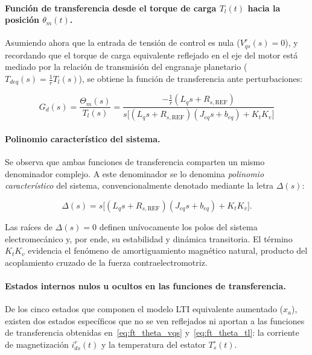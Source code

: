 \documentclass[10pt,a4paper]{article}
\begin{document}
\paragraph{Función de transferencia desde el torque de carga $T_l(t)$ hacia la posición $\theta_m(t)$.}
Asumiendo ahora que la entrada de tensión de control es nula ($V_{qs}^r(s) = 0$), 
y recordando que el torque de carga equivalente reflejado en el eje del motor está mediado por la relación de transmisión del engranaje planetario ($T_{deq}(s) = \frac{1}{r} T_l(s)$), 
se obtiene la función de transferencia ante perturbaciones:

\begin{equation}
    \boxed{
        G_d(s) = \frac{\Theta_m(s)}{T_l(s)} = \frac{-\frac{1}{r} (L_q s + R_{s,\mathrm{REF}})}{s \Big[ (L_q s + R_{s,\mathrm{REF}})(J_{eq}s + b_{eq}) + K_t K_v \Big]}
    }
    \label{eq:ft_theta_tl}
\end{equation}

\paragraph{Polinomio característico del sistema.}
Se observa que ambas funciones de transferencia comparten un mismo denominador complejo. 
A este denominador se lo denomina \textit{polinomio característico} del sistema, 
convencionalmente denotado mediante la letra $\Delta(s)$:

\begin{equation}
    \Delta(s) = s \Big[ (L_q s + R_{s,\mathrm{REF}})(J_{eq}s + b_{eq}) + K_t K_v \Big].
    \label{eq:polinomio_caracteristico_motor}
\end{equation}

Las raíces de $\Delta(s) = 0$ definen unívocamente los polos del sistema electromecánico y, por ende, su estabilidad y dinámica transitoria. 
El término $K_t K_v$ evidencia el fenómeno de amortiguamiento magnético natural, 
producto del acoplamiento cruzado de la fuerza contraelectromotriz.

\paragraph{Estados internos nulos u ocultos en las funciones de transferencia.}
De los cinco estados que componen el modelo LTI equivalente aumentado ($x_a$), existen dos estados específicos que no se ven reflejados ni aportan a las funciones de transferencia obtenidas en~\eqref{eq:ft_theta_vqs} y~\eqref{eq:ft_theta_tl}: la corriente de magnetización $i_{ds}^r(t)$ y la temperatura del estator $T_s^\circ(t)$.
\end{document}
